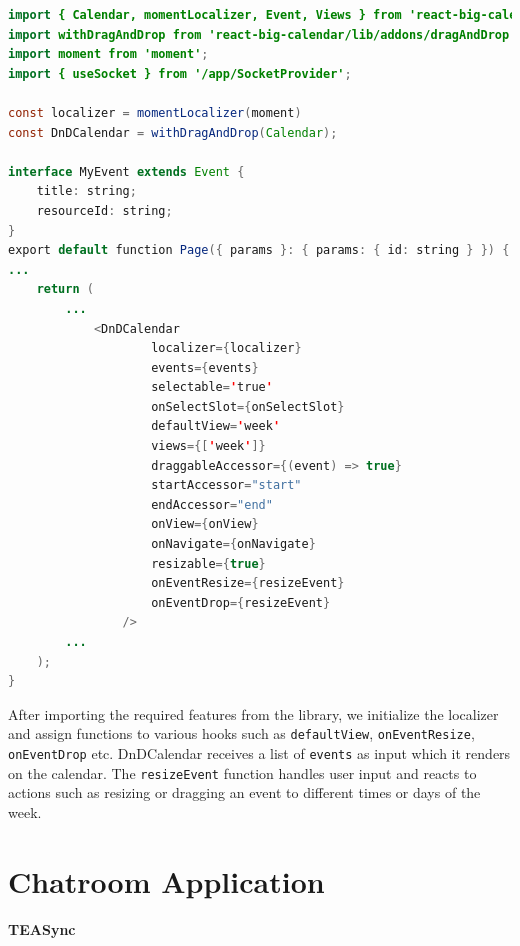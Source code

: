 \begin{lstlisting}[language=Java, caption=Drag and Drop Calendar Initialization, label=lst:java, mathescape=true]
import { Calendar, momentLocalizer, Event, Views } from 'react-big-calendar';
import withDragAndDrop from 'react-big-calendar/lib/addons/dragAndDrop';
import moment from 'moment';
import { useSocket } from '/app/SocketProvider';

const localizer = momentLocalizer(moment)
const DnDCalendar = withDragAndDrop(Calendar);

interface MyEvent extends Event {
    title: string;
    resourceId: string;
}
export default function Page({ params }: { params: { id: string } }) {
...
    return (
        ...
            <DnDCalendar
                    localizer={localizer}
                    events={events}
                    selectable='true'
                    onSelectSlot={onSelectSlot}
                    defaultView='week'
                    views={['week']}
                    draggableAccessor={(event) => true}
                    startAccessor="start"
                    endAccessor="end"
                    onView={onView}
                    onNavigate={onNavigate}
                    resizable={true}
                    onEventResize={resizeEvent}
                    onEventDrop={resizeEvent}
                />
        ...
    );
}
\end{lstlisting}

After importing the required features from the library, we initialize the localizer and assign functions to various hooks such as \lstinline{defaultView}, \lstinline{onEventResize}, \lstinline{onEventDrop} etc. DnDCalendar receives a list of \lstinline{events} as input which it renders on the calendar. The \lstinline{resizeEvent} function handles user input and reacts to actions such as resizing or dragging an event to different times or days of the week.

\section{Chatroom Application}

\textbf{TEASync}





